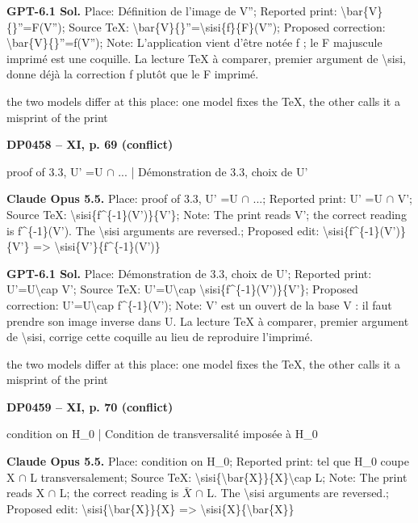 \textbf{GPT-6.1 Sol.} Place: Définition de l'image de V''; Reported print: \textbackslash{}bar\{V\}\{\}''=\allowbreak F(V''); Source TeX: \textbackslash{}bar\{V\}\{\}''=\allowbreak \textbackslash{}sisi\{f\}\{F\}(V''); Proposed correction: \textbackslash{}bar\{V\}\{\}''=\allowbreak f(V''); Note: L'application vient d'être notée f ; le F majuscule imprimé est une coquille. La lecture TeX à comparer, premier argument de \textbackslash{}sisi, donne déjà la correction f plutôt que le F imprimé.\par
the two models differ at this place: one model fixes the TeX, the other calls it a misprint of the print\par
\par\noindent\hypertarget{DP0458}{}\textbf{DP0458 -- XI, p. 69 (conflict)}\par
proof of 3.3, U' =\allowbreak  U \ensuremath{\cap} ... | Démonstration de 3.3, choix de U'\par
\textbf{Claude Opus 5.5.} Place: proof of 3.3, U' =\allowbreak  U \ensuremath{\cap} ...; Reported print: U' =\allowbreak  U \ensuremath{\cap} V'; Source TeX: \textbackslash{}sisi\{f\textasciicircum{}\{-1\}(V')\}\{V'\}; Note: The print reads V'; the correct reading is f\textasciicircum{}\{-1\}(V'). The \textbackslash{}sisi arguments are reversed.; Proposed edit: \textbackslash{}sisi\{f\textasciicircum{}\{-1\}(V')\}\{V'\} =\allowbreak > \textbackslash{}sisi\{V'\}\{f\textasciicircum{}\{-1\}(V')\}\par
\textbf{GPT-6.1 Sol.} Place: Démonstration de 3.3, choix de U'; Reported print: U'=\allowbreak U\textbackslash{}cap V'; Source TeX: U'=\allowbreak U\textbackslash{}cap \textbackslash{}sisi\{f\textasciicircum{}\{-1\}(V')\}\{V'\}; Proposed correction: U'=\allowbreak U\textbackslash{}cap f\textasciicircum{}\{-1\}(V'); Note: V' est un ouvert de la base V : il faut prendre son image inverse dans U. La lecture TeX à comparer, premier argument de \textbackslash{}sisi, corrige cette coquille au lieu de reproduire l'imprimé.\par
the two models differ at this place: one model fixes the TeX, the other calls it a misprint of the print\par
\par\noindent\hypertarget{DP0459}{}\textbf{DP0459 -- XI, p. 70 (conflict)}\par
condition on H\_0 | Condition de transversalité imposée à H\_0\par
\textbf{Claude Opus 5.5.} Place: condition on H\_0; Reported print: tel que H\_0 coupe X \ensuremath{\cap} L transversalement; Source TeX: \textbackslash{}sisi\{\textbackslash{}bar\{X\}\}\{X\}\textbackslash{}cap L; Note: The print reads X \ensuremath{\cap} L; the correct reading is \ensuremath{\bar{X}} \ensuremath{\cap} L. The \textbackslash{}sisi arguments are reversed.; Proposed edit: \textbackslash{}sisi\{\textbackslash{}bar\{X\}\}\{X\} =\allowbreak > \textbackslash{}sisi\{X\}\{\textbackslash{}bar\{X\}\}\par
